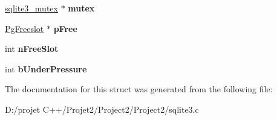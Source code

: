 \begin{DoxyCompactItemize}
\mbox{\hyperlink{structsqlite3__mutex}{sqlite3\+\_\+mutex}} $\ast$ {\bfseries mutex}
\item 
\mbox{\label{struct_p_cache_global_a40c7637e78c1912b5f54d0d18bc466eb}} 
\mbox{\hyperlink{struct_pg_freeslot}{Pg\+Freeslot}} $\ast$ {\bfseries p\+Free}
\item 
\mbox{\label{struct_p_cache_global_a41bfc176dfedd84d6e538f959ea03990}} 
int {\bfseries n\+Free\+Slot}
\item 
\mbox{\label{struct_p_cache_global_adf740d364f04d03f6a2c4d12b165684f}} 
int {\bfseries b\+Under\+Pressure}
\end{DoxyCompactItemize}


The documentation for this struct was generated from the following file\+:\begin{DoxyCompactItemize}
\item 
D\+:/projet C++/\+Projet2/\+Project2/\+Project2/sqlite3.\+c\end{DoxyCompactItemize}
